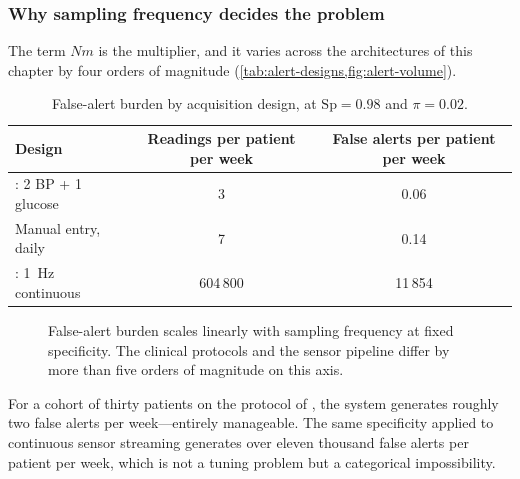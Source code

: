 \documentclass[12pt,a4paper,oneside]{report}
\begin{document}
\subsubsection{Why sampling frequency decides the problem}\label{sec:frequency-decides}

The term $Nm$ is the multiplier, and it varies across the architectures of this chapter by four orders of magnitude (\cref{tab:alert-designs,fig:alert-volume}).

\begin{table}[htbp]
\centering\small
\caption{False-alert burden by acquisition design, at $\mathrm{Sp} = 0.98$ and $\pi = 0.02$.}\label{tab:alert-designs}
\begin{tabularx}{\textwidth}{@{}X c c@{}}
\toprule
\textbf{Design} & \textbf{Readings per patient per week} & \textbf{False alerts per patient per week} \\
\midrule
\textcite{mihevc2025}: 2 BP + 1 glucose & 3 & 0.06 \\
Manual entry, daily & 7 & 0.14 \\
\textcite{efendi2025}: 1~Hz continuous & 604\,800 & 11\,854 \\
\bottomrule
\end{tabularx}
\end{table}

\begin{figure}[htbp]
\centering
{}
\caption{False-alert burden scales linearly with sampling frequency at fixed specificity. The clinical protocols and the sensor pipeline differ by more than five orders of magnitude on this axis.}\label{fig:alert-volume}
\end{figure}

For a cohort of thirty patients on the protocol of \textcite{mihevc2025}, the system generates roughly two false alerts per week---entirely manageable. The same specificity applied to continuous sensor streaming generates over eleven thousand false alerts per patient per week, which is not a tuning problem but a categorical impossibility.
\end{document}
